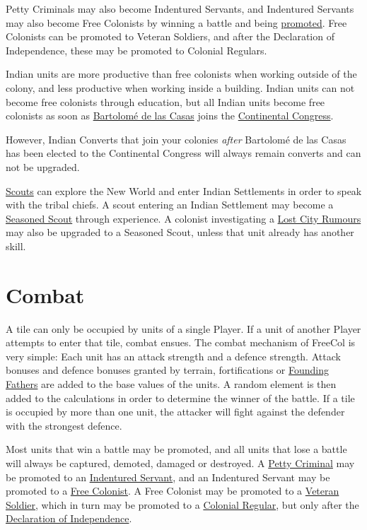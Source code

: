 \documentclass[12pt]{book}
\begin{document}
Petty Criminals may also become Indentured Servants, and Indentured
Servants may also become Free Colonists by winning a battle and being
\hyperlink{promotion}{promoted}. Free Colonists can be promoted to
Veteran Soldiers, and after the Declaration of Independence, these may
be promoted to Colonial Regulars.

Indian units are more productive than free colonists when working
outside of the colony, and less productive when working inside a
building. Indian units can not become free colonists through
education, but all Indian units become free colonists as soon as
\hyperlink{Bartolome de las Casas}{Bartolom\'e de las Casas} joins
the \hyperlink{Continental Congress}{Continental Congress}.

However, Indian Converts that join your colonies {\em after}
Bartolom\'e de las Casas has been elected to the Continental Congress
will always remain converts and can not be upgraded.

\hyperlink{Scout}{Scouts} can explore the New World and enter Indian
Settlements in order to speak with the tribal chiefs. A scout entering
an Indian Settlement may become a \hyperlink{Seasoned Scout}{Seasoned
Scout} through experience. A colonist investigating a \hyperlink{Lost
City Rumours}{Lost City Rumours} may also be upgraded to a Seasoned
Scout, unless that unit already has another skill.


\hypertarget{Combat}{\section{Combat}}

A tile can only be occupied by units of a single Player. If a unit of
another Player attempts to enter that tile, combat ensues. The combat
mechanism of FreeCol is very simple: Each unit has an attack strength
and a defence strength. Attack bonuses and defence bonuses granted by
terrain, fortifications or \hyperlink{Founding Fathers}{Founding
  Fathers} are added to the base values of the units. A random element
is then added to the calculations in order to determine the winner of
the battle. If a tile is occupied by more than one unit, the attacker
will fight against the defender with the strongest defence.

Most units that win a battle may be \hypertarget{promotion}{promoted},
and all units that lose a battle will always be captured, demoted,
damaged or destroyed. A \hyperlink{Petty Criminal}{Petty Criminal} may
be promoted to an \hyperlink{Indentured Servant}{Indentured Servant},
and an Indentured Servant may be promoted to a \hyperlink{Free
  Colonist}{Free Colonist}. A Free Colonist may be promoted to a
\hyperlink{Veteran Soldier}{Veteran Soldier}, which in turn may be
promoted to a \hyperlink{Colonial Regular}{Colonial Regular}, but only
after the \hyperlink{Declaration of Independence}{Declaration of
  Independence}.
\end{document}
